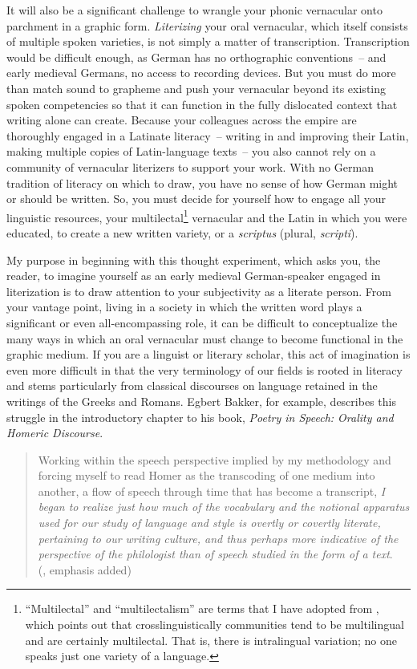It will also be a significant challenge to wrangle your phonic vernacular onto parchment in a graphic form. \textit{Literizing} your oral vernacular, which itself consists of multiple spoken varieties, is not simply a matter of transcription. Transcription would be difficult enough, as German has no orthographic conventions~-- and early medieval Germans, no access to recording devices. But you must do more than match sound to grapheme and push your vernacular beyond its existing spoken competencies so that it can function in the fully dislocated context that writing alone can create. Because your colleagues across the empire are thoroughly engaged in a Latinate literacy~-- writing in and improving their Latin, making multiple copies of Latin-language texts~-- you also cannot rely on a community of vernacular literizers to support your work. With no German tradition of literacy on which to draw, you have no sense of how German might or should be written. So, you must decide for yourself how to engage all your linguistic resources, your multilectal\footnote{“Multilectal” and “multilectalism” are terms that I have adopted from \citet[42--44]{Höder2010}, which points out that crosslinguistically communities tend to be multilingual and are certainly multilectal. That is, there is intralingual variation; no one speaks just one variety of a language.} vernacular and the Latin in which you were educated, to create a new written variety, or a \textit{scriptus} (plural, \textit{scripti}).

My purpose in beginning with this thought experiment, which asks you, the reader, to imagine yourself as an early medieval German-speaker engaged in literization is to draw attention to your subjectivity as a literate person. From your vantage point, living in a society in which the written word plays a significant or even all-encompassing role, it can be difficult to conceptualize the many ways in which an oral vernacular must change to become functional in the graphic medium. If you are a linguist or literary scholar, this act of imagination is even more difficult in that the very terminology of our fields is rooted in literacy and stems particularly from classical discourses on language retained in the writings of the Greeks and Romans. Egbert Bakker, for example, describes this struggle in the introductory chapter to his \citeyear{Bakker1997} book, \textit{Poetry in Speech: Orality and Homeric Discourse}. 

\begin{quote}
Working within the speech perspective implied by my methodology and forcing myself to read Homer as the transcoding of one medium into another, a flow of speech through time that has become a transcript, \textit{I began to realize just how much of the vocabulary and the notional apparatus used for our study of language and style is overtly or covertly literate, pertaining to our writing culture, and thus perhaps more indicative of the perspective of the philologist than of speech studied in the form of a text}.\\
\hbox{}\hfill(\citealt[3]{Bakker1997}, emphasis added)\hbox{}
\end{quote}

